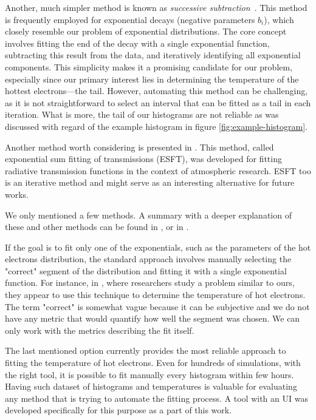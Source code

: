 Another, much simpler method is known as \textit{successive subtraction}~\cite{fitexp-trans}. This method is frequently employed for exponential decays (negative parameters $b_i$), which closely resemble our problem of exponential distributions. The core concept involves fitting the end of the decay with a single exponential function, subtracting this result from the data, and iteratively identifying all exponential components. This simplicity makes it a promising candidate for our problem, especially since our primary interest lies in determining the temperature of the hottest electrons—the tail. However, automating this method can be challenging, as it is not straightforward to select an interval that can be fitted as a tail in each iteration. What is more, the tail of our histograms are not reliable as was discussed with regard of the example histogram in figure \ref{fig:example-histogram}.

Another method worth considering is presented in \cite{fitexp-trans}. This method, called exponential sum fitting of transmissions (ESFT), was developed for fitting radiative transmission functions in the context of atmospheric research. ESFT too is an iterative method and might serve as an interesting alternative for future works.

We only mentioned a few methods. A summary with a deeper explanation of these and other methods can be found in \cite{fitexp-trans}, \cite{fitexp-summary} or in \cite{fitexp-summary2}.

If the goal is to fit only one of the exponentials, such as the parameters of the hot electrons distribution, the standard approach involves manually selecting the "correct" segment of the distribution and fitting it with a single exponential function. For instance, in \cite{cui2013}, where researchers study a problem similar to ours, they appear to use this technique to determine the temperature of hot electrons. The term "correct" is somewhat vague because it can be subjective and we do not have any metric that would quantify how well the segment was chosen. We can only work with the metrics describing the fit itself.

The last mentioned option currently provides the most reliable approach to fitting the temperature of hot electrons. Even for hundreds of simulations, with the right tool, it is possible to fit manually every histogram within few hours. Having such dataset of histograms and temperatures is valuable for evaluating any method that is trying to automate the fitting process. A tool with an UI was developed specifically for this purpose as a part of this work.

